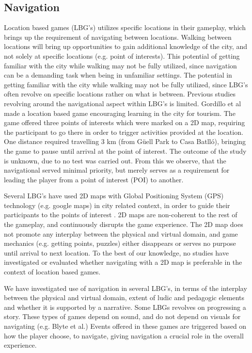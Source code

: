 \subsection{Navigation}
Location based games (LBG's) utilizes specific locations in their gameplay, which brings up the requirement of navigating between locations. Walking between locations will bring up opportunities to gain additional knowledge of the city, and not solely at specific locations (e.g. point of interests). This potential of getting familiar with the city while walking may not be fully utilized, since navigation can be a demanding task when being in unfamiliar settings. The potential in getting familiar with the city while walking may not be fully utilized, since LBG's often revolve on specific locations rather on what is between. Previous studies revolving around the navigational aspect within LBG’s is limited. 
Gordillo et al made a location based game encouraging learning in the city for tourism\cite{Learninggamified}. The game offered three points of interests which were marked on a 2D map, requiring the participant to go there in order to trigger activities provided at the location.  One distance required travelling 3 km (from Güell Park to Casa Batlló), bringing the game to pause until arrival at the point of interest.  The outcome of the study is unknown, due to no test was carried out.  From this we observe, that the navigational served minimal priority, but merely serves as a requirement for leading the player from a point of interest (POI) to another. 

Several LBG's have used 2D maps with Global Positioning System (GPS) technology (e.g. google maps) in city related context, in order to guide their participants to the points of interest \cite{TheoreticalAndMethod, Learninggamified, knowcity, Carrigy:2010:DEP:1868914.1868929, GamingTourism, Procyk:2013:GLG:2468356.2468550, Bell:2009:ESN:1518701.1518723}. 2D maps are non-coherent to the rest of the gameplay, and continuously disrupts the game experience. The 2D map does not promote any interplay between the physical and virtual domain, and game mechanics (e.g. getting points, puzzles) either disappears or serves no purpose until arrival to next location.  To the best of our knowledge, no studies have investigated or evaluated whether navigating with a 2D map is preferable in the context of location based games. 

We have investigated use of navigation in several LBG's, in terms of the interplay between the physical and virtual domain, extent of ludic and pedagogic elements and whether it is supported by a narrative. Some LBGs revolves on progressing a story. These types of games depend on sound, and do not depend on visuals for navigating (e.g. Blyte et al.) Events offered in these games are triggered based on how the player choose, to navigate, giving navigation a crucial role in the overall experience.

